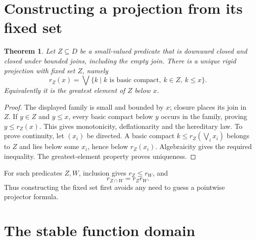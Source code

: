 \documentclass[11pt]{article}
\newtheorem{theorem}{Theorem}[section]
\begin{document}
\section{Constructing a projection from its fixed set}

\begin{theorem}\label{thm:subdomain}
Let $Z\subseteq D$ be a small-valued predicate that is downward closed
and closed under bounded joins, including the empty join. There is a
unique rigid projection with fixed set $Z$, namely
\[
 r_Z(x)=\bigvee\{k\mid k\text{ is basic compact},\ k\in Z,\ k\le x\}.
\]
Equivalently it is the greatest element of $Z$ below $x$.
\end{theorem}
\begin{proof}
The displayed family is small and bounded by $x$; closure places its
join in $Z$. If $y\in Z$ and $y\le x$, every basic compact below $y$
occurs in the family, proving $y\le r_Z(x)$. This gives monotonicity,
deflationarity and the hereditary law. To prove continuity, let $(x_i)$
be directed. A basic compact $k\le r_Z(\bigvee_i x_i)$ belongs to $Z$
and lies below some $x_i$, hence below $r_Z(x_i)$. Algebraicity gives
the required inequality. The greatest-element property proves uniqueness.
\end{proof}

For such predicates $Z,W$, inclusion gives $r_Z\le r_W$, and
\[
 r_{Z\cap W}=r_Zr_W.
\]
Thus constructing the fixed set first avoids any need to guess a
pointwise projector formula.

\section{The stable function domain}
\end{document}
